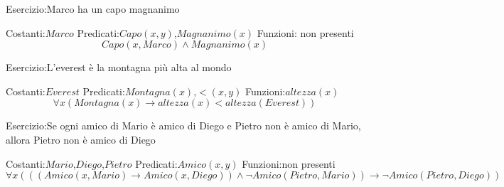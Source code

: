 Esercizio:Marco ha un capo magnanimo

Costanti:$Marco$ \newline
Predicati:$Capo(x,y)$,$Magnanimo(x)$ \newline
Funzioni: non presenti \newline
\begin{equation*}
    Capo(x,Marco) \land Magnanimo(x)
\end{equation*}

Esercizio:L'everest è la montagna più alta al mondo

Costanti:$Everest$ \newline
Predicati:$Montagna(x)$,$<(x,y)$ \newline
Funzioni:$altezza(x)$
\begin{equation*}
    \forall x (Montagna(x) \rightarrow altezza(x) < altezza(Everest))
\end{equation*}

Esercizio:Se ogni amico di Mario è amico di Diego e Pietro non è amico di
          Mario, allora Pietro non è amico di Diego

Costanti:$Mario$,$Diego$,$Pietro$ \newline
Predicati:$Amico(x,y)$ \newline
Funzioni:non presenti
\begin{equation*}
    \forall x (((Amico(x,Mario) \rightarrow Amico(x,Diego)) \land \neg Amico(Pietro,Mario))
                \rightarrow \neg Amico(Pietro,Diego))
\end{equation*}
